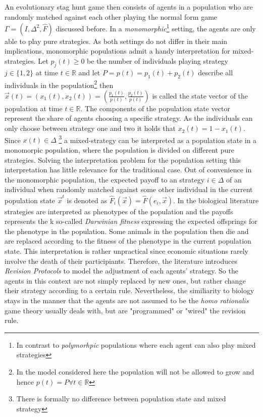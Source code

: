 \documentclass[11pt]{article}
\newcommand{\realnumb}{\mathbb{R}}
\begin{document}
An evolutionary stag hunt game then consists of agents in a population who
are randomly matched against each other playing the normal form game 
$\Gamma = (I,\Delta^2,\hat{F})$ discussed before. In a \textit{monomorphic}\footnote{In 
contrast to \textit{polymorhpic} populations where each agent can also 
play mixed strategies} setting, the agents are only able to play pure 
strategies. As both settings do not differ in their main implications, 
monomorphic populations admit a handy interpretation for mixed-strategies.
Let $p_j(t) \geq 0$ be the number of individuals playing strategy $j \in \{1,2\}$
at time $t \in \realnumb$ and let $P = p(t) = p_1(t) + p_2(t)$ describe all individuals 
in the population\footnote{In the model considered here the population will 
not be allowed to grow and hence $p(t) = P \forall t \in \realnumb$}
then $\vec{x}(t) = \left(x_1(t),x_2(t)\right)
=\left(\frac{p_1(t)}{p(t)},\frac{p_2(t)}{p(t)}\right)$ 
is called the state vector of the population at
time $t \in \realnumb$. The components of the population state vector represent
the share of agents choosing a specific strategy. 
As the individuals can only choose between strategy one and two it holds that 
$x_2(t) = 1-x_1(t)$. Since $x(t) \in \Delta$ \footnote{There is formally no
difference between population state and mixed strategy} a mixed-strategy can 
be interpreted as a population state in a monomorpic population, where the 
population is divided on different pure strategies. Solving the interpretation
problem for the population setting this interpretation has little relevance
for the traditional case. 
Out of convenience in the monomorphic population, the expected payoff 
to an strategy $i \in \Delta$ of an individual when randomly matched
against some other individual in the current population state $\vec{x}^t$ 
is denoted as $\hat{F}_i(\vec{x}) = \hat{F}(e_i,\vec{x})$.
In the biological literature \cite{smith_evolution_1982} strategies are 
interpreted as phenotypes of the population and the payoffs represents the k
so-called  \textit{Darwinian fitness} expressing the expected offsprings for 
the phenotype in the population. Some animals in the population then die and 
are replaced according to the fitness of the phenotype in the current 
population state.  
 This interpretation is rather unpractical since economic situations rarely
involve the death of their participiants. Therefore, the literature introduces
\textit{Revision Protocols} to model the adjustment of each agents' strategy.
So the agents in this context are not simply replaced by new ones, but rather
change their strategy according to a certain rule. Nevertheless, the
similiarity to biology stays in the manner that the agents are not
assumed to be the \textit{homo rationalis} game theory usually deals with, but
are "programmed" or "wired" \parencite{gintis_game_2000} the revision rule.
\end{document}
